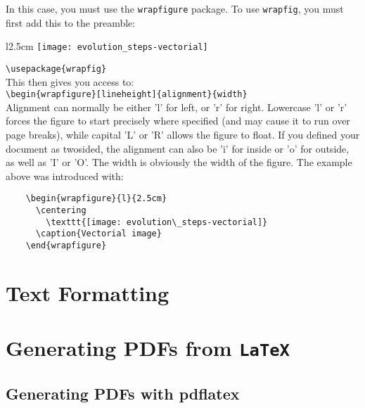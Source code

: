  In this case, you must use the \verb!wrapfigure! package.  To use \verb!wrapfig!, you must first add this to the preamble:
 
 \begin{wrapfigure}{l}{2.5cm}
   \centering
     \texttt{[image: evolution\_steps-vectorial]}
   \caption{Vectorial image}
 \end{wrapfigure}	
 
 \noindent\verb!\usepackage{wrapfig}!\\
 This then gives you access to:\\
 \verb!\begin{wrapfigure}[lineheight]{alignment}{width}!
 \\
 Alignment can normally be either 'l' for left, or 'r' for right. Lowercase 'l' or 'r' forces the figure to start precisely where specified (and may cause it to run over page breaks), while capital 'L' or 'R' allows the figure to float. If you defined your document as twosided, the alignment can also be 'i' for inside or 'o' for outside, as well as 'I' or 'O'. The width is obviously the width of the figure. The example above was introduced with:
 \begin{lstlisting}
 	\begin{wrapfigure}{l}{2.5cm}
 	  \centering
 	    \texttt{[image: evolution\_steps-vectorial]}
 	  \caption{Vectorial image}
 	\end{wrapfigure}	
 \end{lstlisting}




\section{Text Formatting} %
\label{sec:text_formatting}



\section{Generating PDFs from \texttt{LaTeX}} %
\label{sec:generating_pdfs_from_latex}

\subsection{Generating PDFs with pdflatex} %
\label{ssec:generating_pdfs_with_pdflatex}

